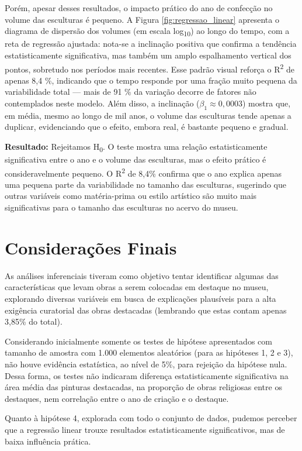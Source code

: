 \documentclass[11pt,a4paper]{article}
\begin{document}
Porém, apesar desses resultados, o impacto prático do ano de confecção no volume das esculturas é pequeno. A Figura \ref{fig:regressao_linear} apresenta o diagrama de dispersão dos volumes (em escala log\textsubscript{10}) ao longo do tempo, com a reta de regressão ajustada: nota-se a inclinação positiva que confirma a tendência estatisticamente significativa, mas também um amplo espalhamento vertical dos pontos, sobretudo nos períodos mais recentes. Esse padrão visual reforça o R\textsuperscript{2} de apenas 8,4 \%, indicando que o tempo responde por uma fração muito pequena da variabilidade total — mais de 91 \% da variação decorre de fatores não contemplados neste modelo. Além disso, a inclinação ($\beta_1 \approx 0{,}0003$) mostra que, em média, mesmo ao longo de mil anos, o volume das esculturas tende apenas a duplicar, evidenciando que o efeito, embora real, é bastante pequeno e gradual.

\textbf{Resultado:} Rejeitamos H\textsubscript{0}. O teste mostra uma relação estatisticamente significativa entre o ano e o volume das esculturas, mas o efeito prático é consideravelmente pequeno. O R\textsuperscript{2} de 8,4\% confirma que o ano explica apenas uma pequena parte da variabilidade no tamanho das esculturas, sugerindo que outras variáveis como matéria-prima ou estilo artístico são muito mais significativas para o tamanho das esculturas no acervo do museu.

\section{Considerações Finais}
As análises inferenciais tiveram como objetivo tentar identificar algumas das características que levam obras a serem colocadas em destaque no museu, explorando diversas variáveis em busca de explicações plausíveis para a alta exigência curatorial das obras destacadas (lembrando que estas contam apenas 3,85\% do total).

Considerando inicialmente somente os testes de hipótese apresentados com tamanho de amostra com 1.000 elementos aleatórios (para as hipóteses 1, 2 e 3), não houve evidência estatística, ao nível de 5\%, para rejeição da hipótese nula. Dessa forma, os testes não indicaram diferença estatisticamente significativa na área média das pinturas destacadas, na proporção de obras religiosas entre os destaques, nem correlação entre o ano de criação e o destaque.

Quanto à hipótese 4, explorada com todo o conjunto de dados, pudemos perceber que a regressão linear trouxe resultados estatisticamente significativos, mas de baixa influência prática.
\end{document}
